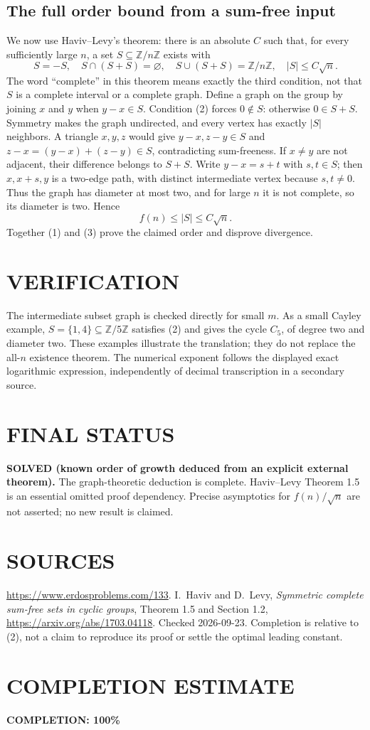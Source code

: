 \subsection*{The full order bound from a sum-free input}
We now use Haviv--Levy's theorem: there is an absolute $C$ such that,
for every sufficiently large $n$, a set $S\subseteq\mathbb Z/n\mathbb Z$
exists with
\[
 S=-S,\quad S\cap(S+S)=\varnothing,\quad
 S\cup(S+S)=\mathbb Z/n\mathbb Z,\quad |S|\le C\sqrt n.   \tag{2}
\]
The word ``complete'' in this theorem means exactly the third
condition, not that $S$ is a complete interval or a complete graph.
Define a graph on the group by joining $x$ and $y$ when $y-x\in S$.
Condition (2) forces $0\notin S$: otherwise $0\in S+S$. Symmetry makes
the graph undirected, and every vertex has exactly $|S|$ neighbors.
A triangle $x,y,z$ would give $y-x,z-y\in S$ and
$z-x=(y-x)+(z-y)\in S$, contradicting sum-freeness.
If $x\ne y$ are not adjacent, their difference belongs to $S+S$.
Write $y-x=s+t$ with $s,t\in S$; then $x,x+s,y$ is a two-edge path,
with distinct intermediate vertex because $s,t\ne0$. Thus the graph
has diameter at most two, and for large $n$ it is not complete, so
its diameter is two. Hence
\[
 f(n)\le|S|\le C\sqrt n.                                \tag{3}
\]
Together (1) and (3) prove the claimed order and disprove divergence.

\section{VERIFICATION}
The intermediate subset graph is checked directly for small $m$.
As a small Cayley example, $S=\{1,4\}\subseteq\mathbb Z/5\mathbb Z$
satisfies (2) and gives the cycle $C_5$, of degree two and diameter two.
These examples illustrate the translation; they do not replace the
all-$n$ existence theorem. The numerical exponent follows the displayed
exact logarithmic expression, independently of decimal transcription
in a secondary source.

\section{FINAL STATUS}
\textbf{SOLVED (known order of growth deduced from an explicit external theorem).}
The graph-theoretic deduction is complete. Haviv--Levy Theorem 1.5 is
an essential omitted proof dependency. Precise asymptotics for
$f(n)/\sqrt n$ are not asserted; no new result is claimed.

\section{SOURCES}
\url{https://www.erdosproblems.com/133}.
I.~Haviv and D.~Levy, \emph{Symmetric complete sum-free sets in cyclic
groups}, Theorem 1.5 and Section 1.2,
\url{https://arxiv.org/abs/1703.04118}.
Checked 2026-09-23. Completion is relative to (2), not a claim to
reproduce its proof or settle the optimal leading constant.

\section{COMPLETION ESTIMATE}
\textbf{COMPLETION: 100\%}
